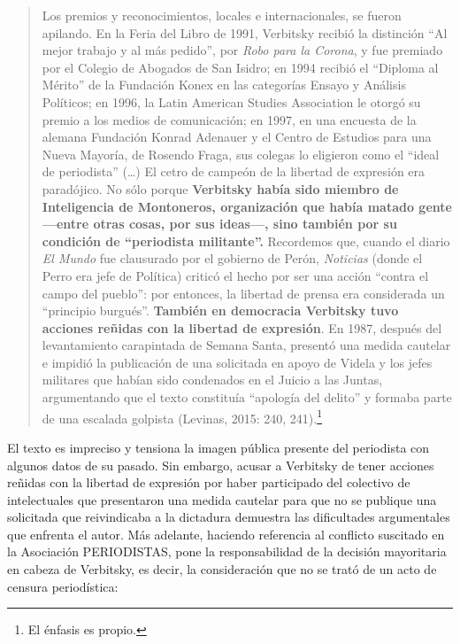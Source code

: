 \begin{quote}
Los premios y reconocimientos, locales e internacionales, se fueron apilando. En la Feria del Libro de 1991, Verbitsky recibió la distinción \enquote{Al mejor trabajo y al más pedido}, por \emph{Robo para la Corona}, y fue premiado por el Colegio de Abogados de San Isidro; en 1994 recibió el \enquote{Diploma al Mérito} de la Fundación Konex en las categorías Ensayo y Análisis Políticos; en 1996, la Latin American Studies Association le otorgó su premio a los medios de comunicación; en 1997, en una encuesta de la alemana Fundación Konrad Adenauer y el Centro de Estudios para una Nueva Mayoría, de Rosendo Fraga, sus colegas lo eligieron como el \enquote{ideal de periodista} (\ldots) El cetro de campeón de la libertad de expresión era paradójico. No sólo porque \textbf{Verbitsky había sido miembro de Inteligencia de Montoneros, organización que había matado gente ---entre otras cosas, por sus ideas---, sino también por su condición de \enquote{periodista militante}.} Recordemos que, cuando el diario \emph{El Mundo} fue clausurado por el gobierno de Perón, \emph{Noticias} (donde el Perro era jefe de Política) criticó el hecho por ser una acción \enquote{contra el campo del pueblo}: por entonces, la libertad de prensa era considerada un \enquote{principio burgués}. \textbf{También en democracia Verbitsky tuvo acciones reñidas con la libertad de expresión}. En 1987, después del levantamiento carapintada de Semana Santa, presentó una medida cautelar e impidió la publicación de una solicitada en apoyo de Videla y los jefes militares que habían sido condenados en el Juicio a las Juntas, argumentando que el texto constituía \enquote{apología del delito} y formaba parte de una escalada golpista (Levinas, 2015: 240, 241).\footnote{El énfasis es propio.}
\end{quote}

El texto es impreciso y tensiona la imagen pública presente del periodista con algunos datos de su pasado. Sin embargo, acusar a Verbitsky de tener acciones reñidas con la libertad de expresión por haber participado del colectivo de intelectuales que presentaron una medida cautelar para que no se publique una solicitada que reivindicaba a la dictadura demuestra las dificultades argumentales que enfrenta el autor. Más adelante, haciendo referencia al conflicto suscitado en la Asociación PERIODISTAS, pone la responsabilidad de la decisión mayoritaria en cabeza de Verbitsky, es decir, la consideración que no se trató de un acto de censura periodística:

